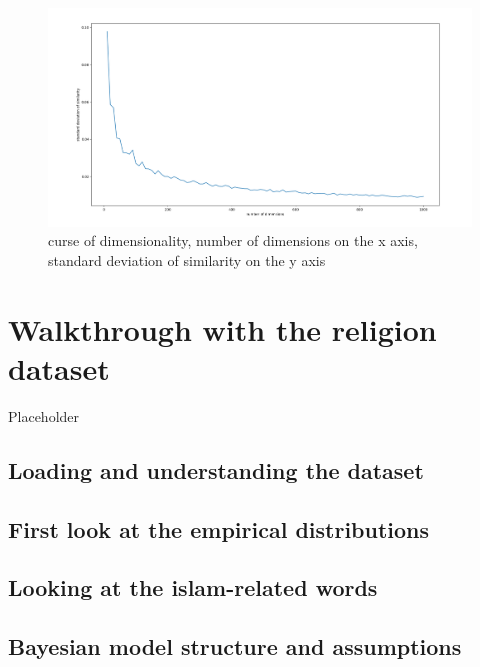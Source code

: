 \documentclass[
  12pt,
]{book}
\begin{document}
\begin{figure}
\centering
\includegraphics{../images/curseOfDimensionality.png}
\caption{curse of dimensionality, number of dimensions on the x axis, standard deviation of similarity on the y axis}
\end{figure}

\hypertarget{walkthrough-with-the-religion-dataset}{%
\chapter{Walkthrough with the religion dataset}\label{walkthrough-with-the-religion-dataset}}

Placeholder

\hypertarget{loading-and-understanding-the-dataset}{%
\section{Loading and understanding the dataset}\label{loading-and-understanding-the-dataset}}

\hypertarget{first-look-at-the-empirical-distributions}{%
\section{First look at the empirical distributions}\label{first-look-at-the-empirical-distributions}}

\hypertarget{looking-at-the-islam-related-words}{%
\section{Looking at the islam-related words}\label{looking-at-the-islam-related-words}}

\hypertarget{bayesian-model-structure-and-assumptions}{%
\section{Bayesian model structure and assumptions}\label{bayesian-model-structure-and-assumptions}}
\end{document}
